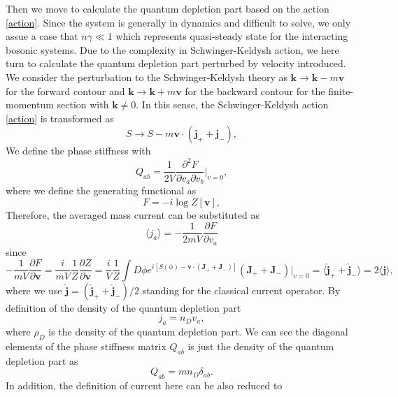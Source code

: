 \documentclass[aps,superscriptaddress,notitlepage,longbibliography]{revtex4-1}
\begin{document}
Then we move to calculate the quantum depletion part based on the
action \eqref{action}. Since the system is generally in dynamics
and difficult to solve, we only assue a case that $n\gamma\ll1$ which
represents quasi-steady state for the interacting bosonic systems.
Due to the complexity in Schwinger-Keldysh action, we here turn to
calculate the quantum depletion part perturbed by velocity introduced.
We consider the perturbation to the Schwinger-Keldysh theory as $\bm{k}\rightarrow\bm{k}-m\bm{v}$
for the forward contour and $\bm{k}\rightarrow\bm{k}+m\bm{v}$ for
the backward contour for the finite-momentum section with $\bm{k}\neq0$.
In this sense, the Schwinger-Keldysh action \eqref{action} is transformed
as 
\begin{equation}
S\rightarrow S-m\bm{v}\cdot(\bm{j}_{+}+\bm{j}_{-}),
\end{equation}
We define the phase stiffness with \citep{Coleman_2015}
\begin{equation}
Q_{ab}=\frac{1}{2V}\frac{\partial^{2}F}{\partial v_{a}\partial v_{b}}|_{v=0},\label{Qv}
\end{equation}
where we define the generating functional as 
\begin{equation}
F=-i\log Z[\bm{v}],
\end{equation}
Therefore, the averaged mass current can be substituted as 
\begin{equation}
\langle j_{a}\rangle=-\frac{1}{2mV}\frac{\partial F}{\partial v_{a}}
\end{equation}
since 
\begin{equation}
-\frac{1}{mV}\frac{\partial F}{\partial\bm{v}}=\frac{i}{mV}\frac{1}{Z}\frac{\partial Z}{\partial\bm{v}}=\frac{i}{V}\frac{1}{Z}\int D\phi e^{i[S(\phi)-\bm{v}\cdot(\bm{J}_{+}+\bm{J}_{-})]}(\bm{J}_{+}+\bm{J}_{-})|_{v=0}=\langle\hat{\bm{j}}_{+}+\hat{\bm{j}}_{-}\rangle=2\langle\bm{j}\rangle,
\end{equation}
where we use $\hat{\bm{j}}=(\hat{\bm{j}}_{+}+\hat{\bm{j}}_{-})/2$
standing for the classical current operator. By definition of the
density of the quantum depletion part 
\begin{equation}
j_{a}=n_{D}v_{a},
\end{equation}
where $\rho_{D}$ is the density of the quantum depletion part. We
can see the diagonal elements of the phase stiffness matrix $Q_{ab}$
is just the density of the quantum depletion part as 
\begin{equation}
Q_{ab}=mn_{D}\delta_{ab}.
\end{equation}
In addition, the definition of current here can be also reduced to
\end{document}
